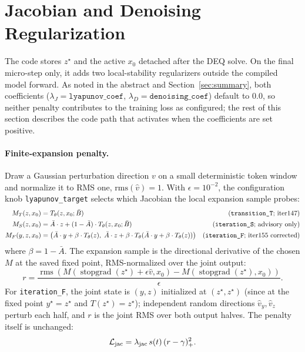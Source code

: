 \documentclass[11pt]{article}
\newcommand{\stopgrad}{\operatorname{stopgrad}}
\begin{document}
\section{Jacobian and Denoising Regularization}
\label{sec:regularization}\label{sec:reg}

The code stores $z^\star$ and the active $x_0$ detached after the DEQ solve.
On the final micro-step only, it adds two local-stability regularizers outside
the compiled model forward.  As noted in the abstract and Section~\ref{sec:summary},
both coefficients ($\lambda_J=\texttt{lyapunov\_coef}$,
$\lambda_D=\texttt{denoising\_coef}$) default to $0.0$, so neither penalty
contributes to the training loss as configured; the rest of this section
describes the code path that activates when the coefficients are set positive.

\paragraph{Finite-expansion penalty.}
Draw a Gaussian perturbation direction $v$ on a small deterministic token
window and normalize it to RMS one, $\mathrm{rms}(\hat v)=1$.  With
$\epsilon=10^{-2}$, the configuration knob \texttt{lyapunov\_target} selects
which Jacobian the local expansion sample probes:
\begin{align*}
  M_T(z,x_0) &= T_\theta(z,x_0;\bar B) & \text{(\texttt{transition\_T}; iter147)} \\
  M_S(z,x_0) &= \bar A\cdot z + (1-\bar A)\cdot T_\theta(z,x_0;\bar B) & \text{(\texttt{iteration\_S}; advisory only)} \\
  M_F(y,z,x_0) &= \big(\bar A\cdot y + \beta\cdot T_\theta(z), \;\bar A\cdot z + \beta\cdot T_\theta(\bar A\cdot y + \beta\cdot T_\theta(z))\big) & \text{(\texttt{iteration\_F}; iter155 corrected)}
\end{align*}
where $\beta = 1-\bar A$.  The expansion sample is the directional derivative
of the chosen $M$ at the saved fixed point, RMS-normalized over the joint
output:
\[
  r =
  \frac{
    \operatorname{rms}\!\left(
      M(\stopgrad(z^\star)+\epsilon\hat v,x_0)
      -
      M(\stopgrad(z^\star),x_0)
    \right)
  }{\epsilon}.
\]
For \texttt{iteration\_F}, the joint state is $(y, z)$ initialized at
$(z^\star, z^\star)$ (since at the fixed point $y^\star = z^\star$ and
$T(z^\star) = z^\star$); independent random directions $\hat v_y, \hat v_z$
perturb each half, and $r$ is the joint RMS over both output halves.  The
penalty itself is unchanged:
\begin{equation}
  \mathcal{L}_{\rm jac}
    = \lambda_{\rm jac}\,s(t)\,(r-\gamma)_+^2.
  \label{eq:ljac}
\end{equation}
\end{document}
